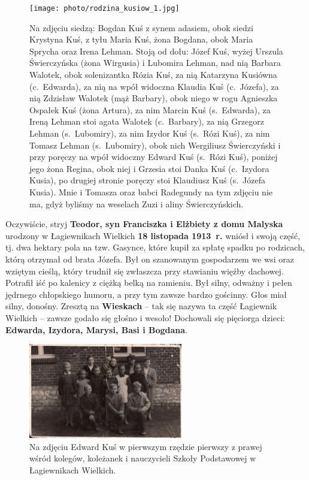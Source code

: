 \begin{figure}[!hp]
\begin{center}
\texttt{[image: photo/rodzina\_kusiow\_1.jpg]}
\caption[Rodzina Kusiów]{Na zdjęciu siedzą: Bogdan Kuś z synem adasiem, obok siedzi Krystyna Kuś, z tyłu Maria Kuś, żona Bogdana, obok Maria Sprycha oraz Irena Lehman. Stoją od dołu: Józef Kuś, wyżej Urszula Świerczyńska (żona Wirgusia) i Lubomira Lehman, nad nią Barbara Walotek, obok solenizantka Rózia Kuś, za nią Katarzyna Kusiówna (c.~Edwarda), za nią na wpół widoczna Klaudia Kuś (c.~Józefa), za nią Zdzisław Walotek (mąż Barbary), obok niego w rogu Agnieszka Ospałek Kuś (żona Artura), za nim Marcin Kuś (s.~Edwarda), za Ireną Lehman stoi agata Walotek (c.~Barbary), za nią Grzegorz Lehman (s.~Lubomiry), za nim Izydor Kuś (s.~Rózi Kuś), za nim Tomasz Lehman (s.~Lubomiry), obok nich Wergiliusz Świerczyński i przy poręczy na wpół widoczny Edward Kuś (s.~Rózi Kuś), poniżej jego żona Regina, obok niej i Grzesia stoi Danka Kuś (c.~Izydora Kusia), po drugiej stronie poręczy stoi Klaudiusz Kuś (s.~Józefa Kusia). Mnie i Tomasza oraz babci Radegundy na tym zdjęciu nie ma, gdyż byliśmy na weselach Zuzi i aliny Świerczyńskich.}
\label{rys:rodzina_kusiow_1}
\end{center}
\end{figure}



Oczywiście, stryj \textbf{Teodor, syn Franciszka i Elżbiety z domu Malyska} urodzony w Łagiewnikach Wielkich \textbf{18 listopada 1913~r.} wniósł i swoją część, tj. dwa hektary pola na tzw. Gasynce, które kupił za spłatę spadku po rodzicach, którą otrzymał od brata Józefa. Był on szanowanym gospodarzem we wsi oraz wziętym cieślą, który trudnił się zwłaszcza przy stawianiu więźby dachowej. Potrafił iść po kalenicy z ciężką belką na ramieniu. Był silny, odważny i pełen jędrnego chłopskiego humoru, a przy tym zawsze bardzo gościnny. Głos miał silny, donośny. Zresztą na \textbf{Wieskach} -- tak się nazywa ta część Łagiewnik Wielkich -- zawsze godało się głośno i wesoło! Dochowali się pięciorga dzieci: \textbf{Edwarda, Izydora, Marysi, Basi i Bogdana}.
\begin{figure}[!h]
\begin{center}
\includegraphics[width=0.6\textwidth]{photo/edward_kus_1.jpg}
\caption[Edward Kuś wśród kolegów, koleżanek i nauczycieli Szkoły Podstawowej w Łagiewnikach Wielkich]{Na zdjęciu Edward Kuś w pierwszym rzędzie pierwszy z prawej wśród kolegów, koleżanek i nauczycieli Szkoły Podstawowej w Łagiewnikach Wielkich.}
\label{rys:edward_kus_1}
\end{center}
\end{figure}

